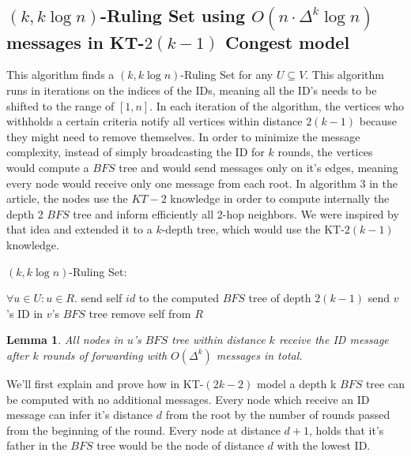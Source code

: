 \documentclass[11pt]{article}
\newtheorem{lemma}{Lemma}
\begin{document}
\subsection{\texorpdfstring{$(k, k\log{n})$-Ruling Set using $O(n\cdot\Delta^k\log{n})$ messages in KT-$2(k-1)$ Congest model}{}}

This algorithm finds a $(k, k\log{n})$-Ruling Set for any $U\subseteq V$. This algorithm runs in iterations on the indices of the IDs, meaning all the ID's needs to be shifted to the range of $[1,n]$. In each iteration of the algorithm, the vertices who withholds a certain criteria notify all vertices within distance $2(k-1)$ because they might need to remove themselves. In order to minimize the message complexity, instead of simply broadcasting the ID for $k$ rounds, the vertices would compute a $BFS$ tree and would send messages only on it's edges, meaning every node would receive only one message from each root. In algorithm 3 in the article, the nodes use the $KT-2$ knowledge in order to compute internally the depth 2 $BFS$ tree and inform efficiently all 2-hop neighbors. We were inspired by that idea and extended it to a $k$-depth tree, which would use the KT-$2(k-1)$ knowledge.

\begin{algorithm}
\caption{$(k, k\log{n})$-Ruling Set:}
\begin{algorithmic}[1]
\State $\forall u\in U: u\in R$.
        \State send self $id$ to the computed $BFS$ tree of depth $2(k-1)$
    \EndIf
        \State send $v$'s ID in $v$'s $BFS$ tree
            \State remove self from $R$
        \EndIf
    \EndIf
\EndFor
\end{algorithmic}
\end{algorithm}


\begin{lemma}
\label{bfs_tree}
All nodes in $u$'s $BFS$ tree within distance $k$ receive the ID message after $k$ rounds of forwarding with $O(\Delta^k)$ messages in total. 
\end{lemma}
We'll first explain and prove how in KT-$(2k-2)$ model a depth k $BFS$ tree can be computed with no additional messages.
Every node which receive an ID message can infer it's distance $d$ from the root by the number of rounds passed from the beginning of the round. Every node at distance $d+1$, holds that it's father in the $BFS$ tree would be the node of distance $d$ with the lowest ID.
\end{document}

